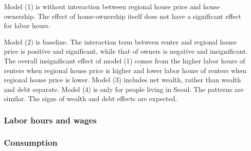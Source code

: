 \documentclass[12pt,letterpaper]{article}
\begin{document}
Model (1) is without interaction between regional house price and house ownership. The effect of home-ownership itself does not have a significant effect for labor hours.

Model (2) is baseline. The interaction term between renter and regional house price is positive and significant, while that of owners is negative and insignificant. The overall insignificant effect of model (1) comes from the higher labor hours of renters when regional house price is higher and lower labor hours of renters when regional house price is lower. Model (3) includes net wealth, rather than wealth and debt separate. Model (4) is only for people living in Seoul. The patterns are similar. The signs of wealth and debt effects are expected. 
\newpage
\subsubsection{Labor hours and wages}





\newpage
\subsubsection{Consumption}


\clearpage


\clearpage
\end{document}
